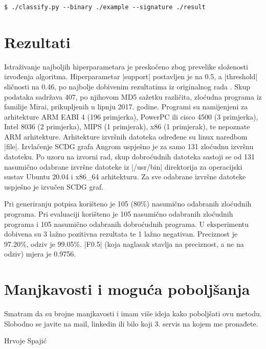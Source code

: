 \begin{lstlisting}[caption={Pokretanje klasifikacije},label={cod:class_py}]
    $ ./classify.py --binary ./example --signature ./result
\end{lstlisting}

\newpage

\section{Rezultati}
Istraživanje najboljih hiperparametara je preskočeno zbog prevelike složenosti
izvođenja algoritma. Hiperparametar \inlinecode|support| postavljen je na
0.5, a \inlinecode|threshold| sličnosti na 0.46, po najbolje dobivenim
rezultatima iz originalnog rada \cite{mirai_main}. Skup podataka sadržava 407,
po njihovom MD5 sažetku različita, zloćudna programa iz familije Mirai,
prikupljenih u lipnju 2017. godine. Programi
su namijenjeni za arhitekture ARM EABI 4 (196 primjerka), PowerPC ili cisco 4500
(3 primjerka), Intel 8036 (2 primjerka), MIPS (1 primjerak), x86 (1 primjerak),
te nepoznate ARM arhitekture. Arhitekture izvršnih datoteka određene su linux
naredbom \inlinecode|file|. Izvlačenje SCDG grafa Angrom uspješno je za samo 131
zloćudnu izvršnu datoteku. Po uzoru na izvorni rad, skup dobroćudnih datoteka
sastoji se od 131 nasumično odabrane izvršne datoteke iz \inlinecode|/usr/bin|
direktorija za operacijski sustav Ubuntu 20.04 i x86\_64 arhitekturu. Za sve
odabrane izvršne datoteke uspješno je izvučen SCDG graf. 

Pri generiranju potpisa korišteno je 105 (80\%) nasumično odabranih zloćudnih
programa. Pri evaluaciji korišteno je 105 nasumično odabranih zloćudnih
programa i 105 nasumično odabranih dobroćudnih programa. U eksperimentu dobivena
su 3 lažno pozitivna rezultata te 1 lažno negativan. Preciznost je 97.20\%,
odziv je 99.05\%. \inlinecode|F0.5| (koja naglasak stavlja na preciznost, a ne
na odziv) mjera je 0.9756.


\section{Manjkavosti i moguća poboljšanja}

Smatram da su brojne manjkavosti i imam više ideja kako poboljšati ovu metodu. Slobodno se javite na mail, linkedin ili bilo koji 3. servis na kojem me pronađete.

Hrvoje Spajić